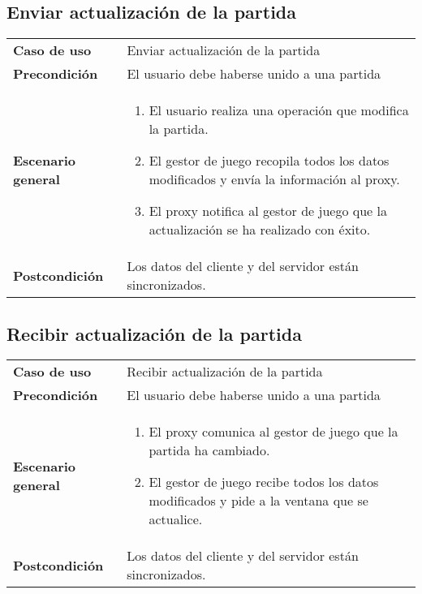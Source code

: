 \subsection{Enviar actualización de la partida}

{\footnotesize
\begin{tabularx}{0.95\textwidth}{p{}|X}

\textbf{Caso de uso} & Enviar actualización de la partida \\

\textbf{Precondición} & El usuario debe haberse unido a una partida \\

\textbf{Escenario general} & \begin{enumerate}
\item El usuario realiza una operación que modifica la partida.
\item El gestor de juego recopila todos los datos modificados y envía la
información al proxy.
\item El proxy notifica al gestor de juego que la actualización se ha realizado
con éxito.
\end{enumerate} \\
\textbf{Postcondición} & Los datos del cliente y del servidor están
sincronizados.

\end{tabularx}
}

\subsection{Recibir actualización de la partida}

{\footnotesize
\begin{tabularx}{0.95\textwidth}{p{}|X}

\textbf{Caso de uso} & Recibir actualización de la partida \\

\textbf{Precondición} & El usuario debe haberse unido a una partida \\

\textbf{Escenario general} & \begin{enumerate}
\item El proxy comunica al gestor de juego que la partida ha cambiado.
\item El gestor de juego recibe todos los datos modificados y pide a la ventana
que se actualice.
\end{enumerate} \\
\textbf{Postcondición} & Los datos del cliente y del servidor están
sincronizados.

\end{tabularx}
}

